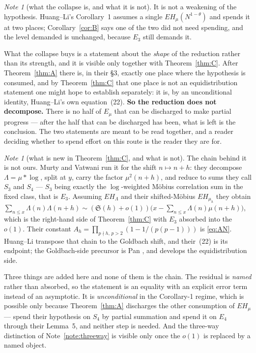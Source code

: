 \documentclass[11pt,a4paper]{article}
\theoremstyle{plain}
\theoremstyle{definition}
\theoremstyle{remark}
\newtheorem{note}[theorem]{Note}
\newcommand{\Emu}{E_\mu}
\begin{document}
\begin{note}[what the collapse is, and what it is
not]\label{note:collapse}
It is not a weakening of the hypothesis. Huang--Li's Corollary~1
assumes a single $EH_\mu(N^{1-\theta})$ and spends it at two places;
Corollary~\ref{cor:B} says one of the two did not need spending, and
the level demanded is unchanged, because $E_3$ still demands it.

What the collapse buys is a statement about the \emph{shape} of the
reduction rather than its strength, and it is visible only together
with Theorem~\ref{thm:C}. After Theorem~\ref{thm:A} there is, in their
\S3, exactly one place where the hypothesis is consumed, and by
Theorem~\ref{thm:C} that one place is not an equidistribution
statement one might hope to establish separately: it is, by an
unconditional identity, Huang--Li's own equation~(22).
\textbf{So the reduction does not decompose.} There is no half of
$\Emu$ that can be discharged to make partial progress --- after the
half that can be discharged has been, what is left is the conclusion.
The two statements are meant to be read together, and a reader
deciding whether to spend effort on this route is the reader they are
for.
\end{note}

\begin{note}[what is new in Theorem~\ref{thm:C}, and what is
not]\label{note:thmCprior}
The chain behind it is not ours. Murty and Vatwani \cite{MV17} run it
for the shift $n\mapsto n+h$: they decompose $\Lambda=\mu*\log$, split
at $y$, carry the factor $\mu^2(n+h)$, and reduce to sums they call
$S_3$ and $S_4$ --- $S_3$ being exactly the $\log$-weighted M\"obius
correlation sum in the fixed class, that is $E_3$. Assuming
$EH_\Lambda$ and their shifted-M\"obius $EH_{\mu_h}$ they obtain
$\sum_{n\le x}\Lambda(n)\Lambda(n+h)\sim(\mathfrak S(h)+o(1))
\bigl(x-\sum_{n\le x}\Lambda(n)\mu(n+h)\bigr)$, which is the
right-hand side of Theorem~\ref{thm:C} with $E_3$ absorbed into the
$o(1)$. Their constant $A_h=\prod_{p\nmid h,\,p>2}(1-1/(p(p-1)))$ is
\eqref{eq:AN}. Huang--Li \cite{HL} transpose that chain to the Goldbach
shift, and their~(22) is its endpoint; the Goldbach-side precursor is
Pan \cite{Pan}, and \cite{Vat19} develops the equidistribution side.

Three things are added here and none of them is the chain. The residual
is \emph{named} rather than absorbed, so the statement is an equality
with an explicit error term instead of an asymptotic. It is
\emph{unconditional} in the Corollary-1 regime, which is possible only
because Theorem~\ref{thm:A} discharges the other consumption of
$EH_\mu$ --- \cite{MV17} spend their hypothesis on $S_4$ by partial
summation and \cite{HL} spend it on $E_4$ through their Lemma~5, and
neither step is needed. And the three-way distinction of
Note~\ref{note:threeway} is visible only once the $o(1)$ is replaced by
a named object.
\end{note}
\end{document}
